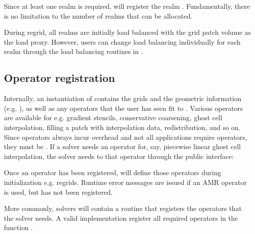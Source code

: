 \documentclass[letterpaper,10pt,english]{sphinxmanual}
\begin{document}
Since at least one realm is required,  will  register the realm .
Fundamentally, there is no limitation to the number of realms that can be allocated.

During regrid, all realms are initially load balanced with the grid patch volume as the load proxy.
However, users can change load balancing individually for each realm through the load balancing routines in {\hyperref[\detokenize{Source/TimeStepper:chap-timestepper}]{}}.


\subsection{Operator registration}
\label{\detokenize{Source/Realm:operator-registration}}
Internally, an instantiation of  contains the grids and the geometric information (e.g. ), as well as any operators that the user has seen fit to .
Various operators are available for e.g. gradient stencils, conservative coarsening, ghost cell interpolation, filling a patch with interpolation data, redistribution, and so on.
Since operators always incur overhead and not all applications require  operators, they must be .
If a solver needs an operator for, say, piecewise linear ghost cell interpolation, the solver needs to  that operator through the  public interface:

\begin{sphinxVerbatim}[commandchars=\\\{\},formatcom=\scriptsize]
  
\end{sphinxVerbatim}

Once an operator has been registered,  will define those operators during initialization e.g. regrids.
Run\sphinxhyphen{}time error messages are issued if an AMR operator is used, but has not been registered.

More commonly,  solvers will contain a routine that registers the operators that the solver needs.
A valid  implementation  register all required operators in the function .
\end{document}
